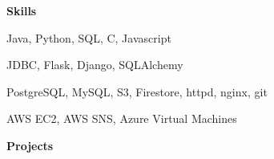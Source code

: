 \documentclass[letterpaper,11pt]{article}
\newcommand{\resheading}[1]{{\large \colorbox{mygrey}{\begin{minipage}{\textwidth}{\textbf{#1 \vphantom{p\^{E}}}}\end{minipage}}}}
\begin{document}
    \resheading{Skills}
    \begin{description}[labelindent=1em]
        \item[Languages:] { \footnotesize
        Java, Python, SQL, C, Javascript
        }
        \item[Frameworks \& Libraries:] { \footnotesize
        JDBC, Flask, Django,  SQLAlchemy
        }
        \item[Databases \& Tools: ]{\footnotesize
        PostgreSQL, MySQL, S3, Firestore, httpd, nginx, git}
        \item[Services:] {\footnotesize
        AWS EC2, AWS SNS, Azure Virtual Machines 
        }

    \end{description} %

    \resheading{Projects}
\end{document}
